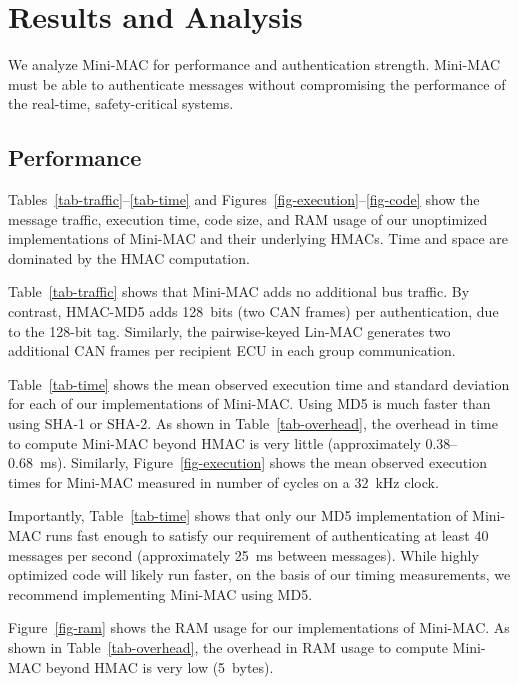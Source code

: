\section{Results and Analysis}
\label{analysis}

We analyze Mini-MAC for performance and authentication strength. 
Mini-MAC must be able to authenticate messages 
without compromising the performance of the real-time, safety-critical systems.

\subsection{Performance}
\label{performance}

Tables~\ref{tab-traffic}--\ref{tab-time} and Figures~\ref{fig-execution}--\ref{fig-code}
show the message traffic, execution time, code size, and RAM usage of our unoptimized implementations
of Mini-MAC and their underlying HMACs.  Time and space are dominated by the HMAC computation.


Table~\ref{tab-traffic} shows that Mini-MAC adds no additional bus traffic.
By contrast, HMAC-MD5 adds 128~bits (two CAN frames) per authentication,
due to the 128-bit tag.  Similarly, the pairwise-keyed Lin-MAC generates
two additional CAN frames per recipient ECU in each group communication.

Table~\ref{tab-time} shows the mean observed execution time
and standard deviation for each of our implementations of Mini-MAC.
Using MD5 is much faster than using SHA-1 or SHA-2.  As shown in Table~\ref{tab-overhead},
the overhead in time to compute Mini-MAC beyond HMAC is very little (approximately 0.38--0.68~ms).
Similarly, Figure~\ref{fig-execution} shows the mean observed execution times for Mini-MAC measured
in number of cycles on a 32~kHz clock.

Importantly, Table~\ref{tab-time} shows that only our 
MD5 implementation of Mini-MAC runs fast enough to satisfy our
requirement of authenticating at least 40 messages per second (approximately
25~ms between messages).   
While highly optimized code will likely run faster, on the
basis of our timing measurements, we recommend implementing Mini-MAC using MD5.

Figure~\ref{fig-ram} shows the RAM usage for our implementations of Mini-MAC.
As shown in Table~\ref{tab-overhead}, the overhead in RAM usage to compute Mini-MAC
beyond HMAC is very low (5~bytes).


